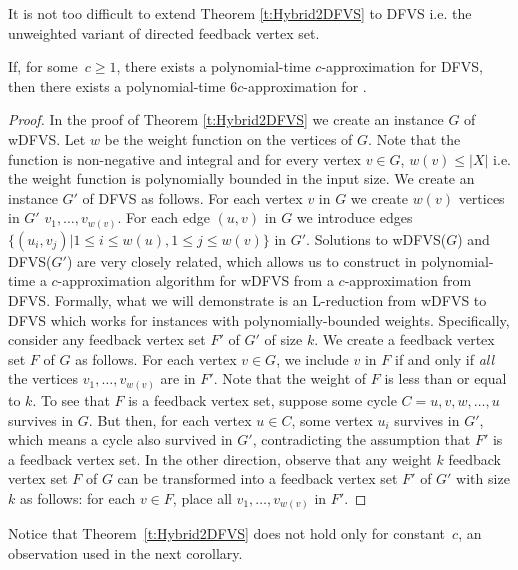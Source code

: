 It is not too difficult to extend Theorem \ref{t:Hybrid2DFVS} to {\sc DFVS} i.e. the unweighted variant of directed feedback vertex set.

\begin{theorem}
\label{t:Hybrid2DFVSunweight} If, for some~$c\geq 1$, there exists a polynomial-time $c$-approximation for {\sc DFVS}, then there exists a polynomial-time $6c$-approximation for \mh.
\end{theorem}
\begin{proof}
In the proof of Theorem \ref{t:Hybrid2DFVS} we create an instance $G$ of {\sc wDFVS}. Let
$w$ be the weight function on the vertices of $G$. Note that the function is non-negative
and integral and for every vertex $v \in G$, $w(v) \leq |X|$ i.e. the weight function is polynomially bounded
in the input size. We create an instance $G'$ of DFVS as follows. For each vertex $v$ in $G$ we create $w(v)$ vertices in $G'$
$v_1, \ldots, v_{w(v)}$. For each edge $(u,v)$ in $G$ we introduce edges
$\{ (u_i, v_j) | 1 \leq i \leq w(u), 1 \leq j \leq w(v) \}$ in $G'$. Solutions to {\sc wDFVS($G$)}
and {\sc DFVS($G'$)} are very closely related, {which allows us to construct in polynomial-time a $c$-approximation
algorithm for {\sc wDFVS} from a $c$-approximation from {\sc DFVS}}.
Formally, what
we will demonstrate is an L-reduction \cite{papayanna} from {\sc wDFVS} to {\sc DFVS} 
which works for instances with polynomially-bounded weights. Specifically, consider any
feedback vertex set $F'$ of $G'$ of size $k$. We create a feedback vertex set $F$ of
$G$ as follows. For each vertex $v \in G$, we include $v$ in $F$ if and only if \emph{all}
the vertices $v_1, \ldots, v_{w(v)}$ are in $F'$. Note that the weight of $F$ is
less than or equal to $k$. To see that $F$ is a feedback vertex set, suppose
some cycle $C = u,v,w,\ldots,u$ survives in $G$. But then, for each vertex $u \in C$,
some vertex $u_i$ survives in $G'$, which means a cycle also survived in $G'$, contradicting
the assumption that $F'$ is a feedback vertex set. In the other direction, observe that any weight $k$ feedback vertex set $F$ of $G$ can be transformed into a feedback vertex set $F'$ of
$G'$ with size $k$ as follows: for each $v \in F$, place all $v_{1}, \ldots, v_{w(v)}$ in $F'$.
\end{proof}

Notice that Theorem~\ref{t:Hybrid2DFVS} does not hold only for constant~$c$, an observation used in the next corollary.

